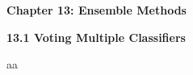 \documentclass{article}
\begin{document}
\begin{center}
    \Huge \textbf{Chapter 13: Ensemble Methods}
    \vspace{0.7cm}
\end{center}

\newpage


\LARGE \textbf{13.1 Voting Multiple Classifiers}

\vspace{0.5cm}

\large aa
\end{document}
